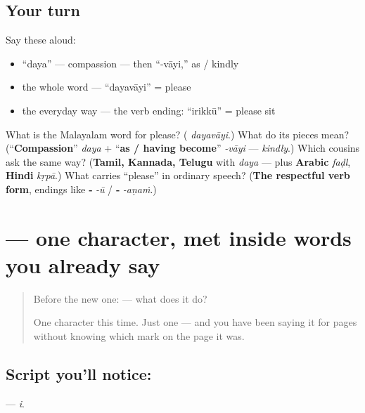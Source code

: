 \subsection*{Your turn}
Say these aloud:

\begin{itemize}
\raggedright
  \item \textquotedblleft{}daya\textquotedblright{} — compassion — then \textquotedblleft{}-vāyi,\textquotedblright{} as / kindly
  \item the whole word — \textquotedblleft{}dayavāyi\textquotedblright{} = please
  \item the everyday way — the verb ending: \textquotedblleft{}irikkū\textquotedblright{} = please sit
\end{itemize}

\begin{tcolorbox}[breakable,colback=teal!4,colframe=teal!35!black,title={Before you move on}]
What is the Malayalam word for please? (\textbf{} \emph{dayavāyi}.) What do its pieces mean? (\textquotedblleft{}\textbf{Compassion}\textquotedblright{} \emph{daya} + \textquotedblleft{}\textbf{as / having become}\textquotedblright{} \emph{-vāyi} — \emph{kindly}.) Which cousins ask the same way? (\textbf{Tamil, Kannada, Telugu} with \emph{daya} — plus \textbf{Arabic} \emph{faḍl}, \textbf{Hindi} \emph{kṛpā}.) What carries \textquotedblleft{}please\textquotedblright{} in ordinary speech? (\textbf{The respectful verb form}, endings like \textbf{‑} \emph{-ū} / \textbf{‑} \emph{-aṇaṁ}.)
\end{tcolorbox}
\section[\texorpdfstring{\ml{ി} (i)}{ി (i)}]{ — one character, met inside words you already say}

\label{lesson:ML-S03-vowel-sign-i}



\begin{quote}
Before the new one:  — what does it do?

One character this time. Just one — and you have been saying it for pages without knowing which mark on the page it was.
\end{quote}

\subsection*{Script you'll notice: }
\textbf{} — \emph{i}.

